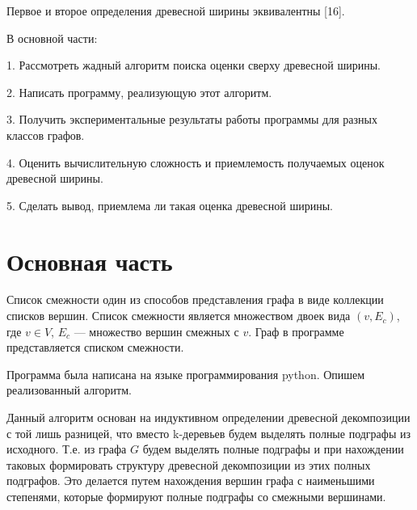 \documentclass[a4paper,12pt]{article}
\begin{document}
\begin{large}
\begin{large}

		Первое и второе определения древесной ширины эквивалентны [16].

		В основной части:

		1. Рассмотреть жадный алгоритм поиска оценки сверху древесной ширины.

		2. Написать программу, реализующую этот алгоритм.

		3. Получить экспериментальные результаты работы программы для разных классов графов.

		4. Оценить вычислительную сложность и приемлемость получаемых оценок древесной ширины.

		5. Сделать вывод, приемлема ли такая оценка древесной ширины.

		\end{large}                            
    
    	\newpage
		\section{Основная часть}
		\renewcommand{\baselinestretch}{1.5}
		\begin{large}
		Список смежности один из способов представления графа в виде коллекции списков вершин.
		Список смежности является множеством двоек вида $(v, E_c)$, где $v \in V$, $E_c $ --- множество вершин смежных с $v$.
		Граф в программе представляется списком смежности.

		Программа была написана на языке программирования python. Опишем реализованный алгоритм.

		Данный алгоритм основан на индуктивном определении древесной декомпозиции с той лишь разницей, что вместо k-деревьев будем выделять полные подграфы из исходного.
		Т.е. из графа $G$ будем выделять полные подграфы и при нахождении таковых формировать структуру древесной декомпозиции из этих полных подграфов.
		Это делается путем нахождения вершин графа с наименьшими степенями, которые формируют полные подграфы со смежными вершинами.


\end{large}
\end{large}
\end{document}
